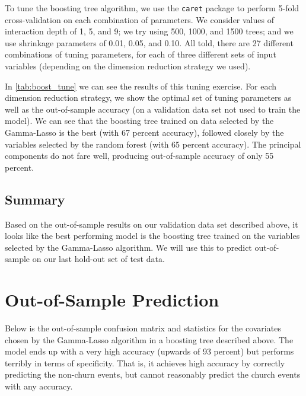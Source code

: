 \documentclass[11pt, fleqn]{article}
\begin{document}
To tune the boosting tree algorithm, we use the \texttt{caret} package to perform 5-fold cross-validation on each combination of parameters. We consider values of interaction depth of 1, 5, and 9; we try using 500, 1000, and 1500 trees; and we use shrinkage parameters of 0.01, 0.05, and 0.10. All told, there are 27 different combinations of tuning parameters, for each of three different sets of input variables (depending on the dimension reduction strategy we used). 

In \cref{tab:boost_tune} we can see the results of this tuning exercise. For each dimension reduction strategy, we show the optimal set of tuning parameters as well as the out-of-sample accuracy (on a validation data set not used to train the model). We can see that the boosting tree trained on data selected by the Gamma-Lasso is the best (with 67 percent accuracy), followed closely by the variables selected by the random forest (with 65 percent accuracy). The principal components do not fare well, producing out-of-sample accuracy of only 55 percent.



\subsection{Summary}

Based on the out-of-sample results on our validation data set described above, it looks like the best performing model is the boosting tree trained on the variables selected by the Gamma-Lasso algorithm. We will use this to predict out-of-sample on our last hold-out set of test data.

\section{Out-of-Sample Prediction}
Below is the out-of-sample confusion matrix and statistics for the covariates chosen by the Gamma-Lasso algorithm in a boosting tree described above. The model ends up with a very high accuracy (upwards of 93 percent) but performs terribly in terms of specificity. That is, it achieves high accuracy by correctly predicting the non-churn events, but cannot reasonably predict the church events with any accuracy. 
\end{document}

